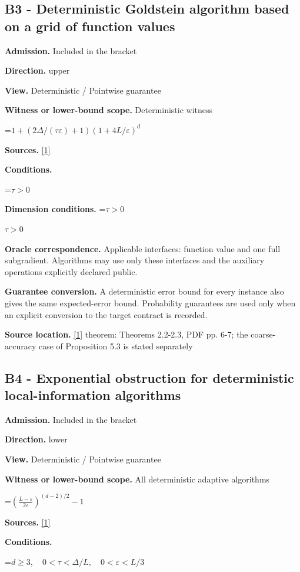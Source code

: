 \documentclass[10pt,a4paper]{article}
\newcommand{\AtlasMath}[1]{\par\begingroup\centering\setbox0=\hbox{$\displaystyle #1$}\ifdim\wd0>1.4\linewidth\typeout{ATLAS WIDE FORMULA: \the\wd0}\fi\ifdim\wd0>\linewidth\resizebox{\linewidth}{!}{\box0}\else\box0\fi\par\endgroup}
\newcommand{\AtlasInlineMath}[1]{\begingroup\setbox0=\hbox{$#1$}\ifdim\wd0>.4\linewidth\endgroup\AtlasMath{#1}\else\endgroup$#1$\fi}
\begin{document}
\subsection{B3 - Deterministic Goldstein algorithm based on a grid of function values}
\textbf{Admission.} Included in the bracket

\textbf{Direction.} upper

\textbf{View.} Deterministic / Pointwise guarantee

\textbf{Witness or lower-bound scope.} Deterministic witness

\AtlasMath{1+(2\Delta/(\tau\varepsilon)+1)(1+4L/\varepsilon)^d}
\textbf{Sources.} \href{https://arxiv.org/pdf/2609.38082v2}{[1]}

\textbf{Conditions.} 
\AtlasMath{\tau>0}


\textbf{Dimension conditions.} \AtlasInlineMath{\tau>0}

\textbf{Oracle correspondence.} Applicable interfaces: function value and one full subgradient. Algorithms may use only these interfaces and the auxiliary operations explicitly declared public.

\textbf{Guarantee conversion.} A deterministic error bound for every instance also gives the same expected-error bound. Probability guarantees are used only when an explicit conversion to the target contract is recorded.

\textbf{Source location.} \href{https://arxiv.org/pdf/2609.38082v2}{[1]} theorem: Theorems 2.2-2.3, PDF pp. 6-7; the coarse-accuracy case of Proposition 5.3 is stated separately

\subsection{B4 - Exponential obstruction for deterministic local-information algorithms}
\textbf{Admission.} Included in the bracket

\textbf{Direction.} lower

\textbf{View.} Deterministic / Pointwise guarantee

\textbf{Witness or lower-bound scope.} All deterministic adaptive algorithms

\AtlasMath{\left(\frac{L-\varepsilon}{2\varepsilon}\right)^{(d-2)/2}-1}
\textbf{Sources.} \href{https://arxiv.org/pdf/2609.38082v2}{[1]}

\textbf{Conditions.} 
\AtlasMath{d\ge3,\quad0<\tau<\Delta/L,\quad0<\varepsilon<L/3}
\end{document}
